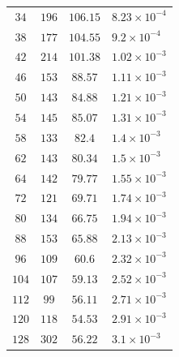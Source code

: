 \documentclass[11pt,a4paper,twoside,
openright]{book}
\begin{document}
\begin{table}
\begin{tabular}{|c | c | c | l |}
		$34$ & $196$ & $106.15$ & $8.23\times 10^{-4}$ \\ 
		$38$ & $177$ & $104.55$ & $9.2\times 10^{-4}$ \\ 
		$42$ & $214$ & $101.38$ & $1.02\times 10^{-3}$ \\ 
		$46$ & $153$ & $88.57$ & $1.11\times 10^{-3}$ \\ 
		$50$ & $143$ & $84.88$ & $1.21\times 10^{-3}$ \\ 
		$54$ & $145$ & $85.07$ & $1.31\times 10^{-3}$ \\ 
		$58$ & $133$ & $82.4$ & $1.4\times 10^{-3}$ \\ 
		$62$ & $143$ & $80.34$ & $1.5\times 10^{-3}$ \\ 
		$64$ & $142$ & $79.77$ & $1.55\times 10^{-3}$ \\ 
		$72$ & $121$ & $69.71$ & $1.74\times 10^{-3}$ \\ 
		$80$ & $134$ & $66.75$ & $1.94\times 10^{-3}$ \\ 
		$88$ & $153$ & $65.88$ & $2.13\times 10^{-3}$ \\ 
		$96$ & $109$ & $60.6$ & $2.32\times 10^{-3}$ \\ 
		$104$ & $107$ & $59.13$ & $2.52\times 10^{-3}$ \\ 
		$112$ & $99$ & $56.11$ & $2.71\times 10^{-3}$ \\ 
		$120$ & $118$ & $54.53$ & $2.91\times 10^{-3}$ \\ 
		$128$ & $302$ & $56.22$ & $3.1\times 10^{-3}$ \\  
		\hline  
	\end{tabular}
\end{table}



{}

\end{document}
